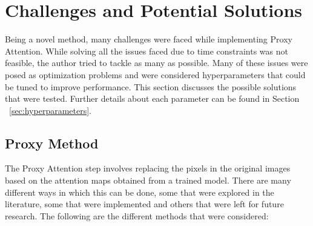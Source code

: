 





\section{Challenges and Potential Solutions}
Being a novel method, many challenges were faced while implementing Proxy Attention. While solving all the issues faced due to time constraints was not feasible, the author tried to tackle as many as possible. Many of these issues were posed as optimization problems and were considered hyperparameters that could be tuned to improve performance. This section discusses the possible solutions that were tested. Further details about each parameter can be found in Section ~\ref{sec:hyperparameters}.

\subsection{Proxy Method}
The Proxy Attention step involves replacing the pixels in the original images based on the attention maps obtained from a trained model. There are many different ways in which this can be done, some that were explored in the literature, some that were implemented and others that were left for future research. The following are the different methods that were considered:

